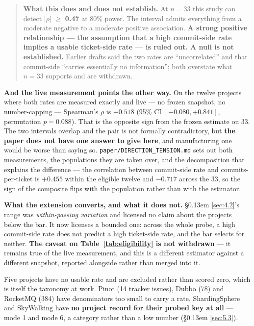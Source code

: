 \documentclass[11pt,a4paper]{article}
\begin{document}
\begin{quote}
\textbf{What this does and does not establish.} At $n = 33$ this study can detect $\lvert \rho \rvert$ $\geq$ \textbf{0.47} at 80\% power. The interval admits everything from a moderate negative to a moderate positive association. \textbf{A strong positive relationship --- the assumption that a high commit-side rate implies a usable ticket-side rate --- is ruled out. A null is not established.} Earlier drafts said the two rates are ``uncorrelated'' and that commit-side ``carries essentially no information''; both overstate what $n = 33$ supports and are withdrawn.

\end{quote}

\textbf{And the live measurement points the other way.} On the twelve projects where both rates are measured exactly and live --- no frozen snapshot, no number-capping --- Spearman's $\rho$ is \textbf{$+0.518$} (95\% CI $[-0.080, +0.841]$, permutation $p = 0.088$). That is the opposite sign from the frozen estimate on 33. The two intervals overlap and the pair is not formally contradictory, but \textbf{the paper does not have one answer to give here}, and manufacturing one would be worse than saying so. \texttt{paper/\allowbreak{}DIRECTION\_\allowbreak{}TENSION.\allowbreak{}md} sets out both measurements, the populations they are taken over, and the decomposition that explains the difference --- the correlation between commit-side rate and commits-per-ticket is \textbf{$+0.455$} within the eligible twelve and \textbf{$-0.717$} across the 33, so the sign of the composite flips with the population rather than with the estimator.

\textbf{What the extension converts, and what it does not.} \S\kern0.13em \ref{sec:4.2}'s range was \emph{within-passing variation} and licensed no claim about the projects below the bar. It now licenses a bounded one: across the whole probe, a high commit-side rate does not predict a high ticket-side rate, and the bar selects for neither. \textbf{The caveat on Table~\ref{tab:eligibility} is not withdrawn} --- it remains true of the live measurement, and this is a different estimator against a different snapshot, reported alongside rather than merged into it.

Five projects have no usable rate and are excluded rather than scored zero, which is itself the taxonomy at work. Pinot (14 tracker issues), Dubbo (78) and RocketMQ (384) have denominators too small to carry a rate. ShardingSphere and SkyWalking have \textbf{no project record for their probed key at all} --- mode 1 and mode 6, a category rather than a low number (\S\kern0.13em \ref{sec:5.3}).
\end{document}
